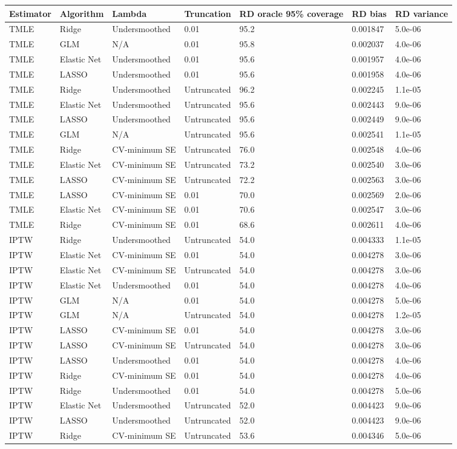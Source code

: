 
\begin{longtable}[l]{lllllll}
\toprule
Estimator & Algorithm & Lambda & Truncation & RD oracle 95\% coverage & RD bias & RD variance\\
\midrule
TMLE & Ridge & Undersmoothed & 0.01 & 95.2 & 0.001847 & 5.0e-06\\
TMLE & GLM & N/A & 0.01 & 95.8 & 0.002037 & 4.0e-06\\
TMLE & Elastic Net & Undersmoothed & 0.01 & 95.6 & 0.001957 & 4.0e-06\\
TMLE & LASSO & Undersmoothed & 0.01 & 95.6 & 0.001958 & 4.0e-06\\
TMLE & Ridge & Undersmoothed & Untruncated & 96.2 & 0.002245 & 1.1e-05\\
TMLE & Elastic Net & Undersmoothed & Untruncated & 95.6 & 0.002443 & 9.0e-06\\
TMLE & LASSO & Undersmoothed & Untruncated & 95.6 & 0.002449 & 9.0e-06\\
TMLE & GLM & N/A & Untruncated & 95.6 & 0.002541 & 1.1e-05\\
TMLE & Ridge & CV-minimum SE & Untruncated & 76.0 & 0.002548 & 4.0e-06\\
TMLE & Elastic Net & CV-minimum SE & Untruncated & 73.2 & 0.002540 & 3.0e-06\\
TMLE & LASSO & CV-minimum SE & Untruncated & 72.2 & 0.002563 & 3.0e-06\\
TMLE & LASSO & CV-minimum SE & 0.01 & 70.0 & 0.002569 & 2.0e-06\\
TMLE & Elastic Net & CV-minimum SE & 0.01 & 70.6 & 0.002547 & 3.0e-06\\
TMLE & Ridge & CV-minimum SE & 0.01 & 68.6 & 0.002611 & 4.0e-06\\
IPTW & Ridge & Undersmoothed & Untruncated & 54.0 & 0.004333 & 1.1e-05\\
IPTW & Elastic Net & CV-minimum SE & 0.01 & 54.0 & 0.004278 & 3.0e-06\\
IPTW & Elastic Net & CV-minimum SE & Untruncated & 54.0 & 0.004278 & 3.0e-06\\
IPTW & Elastic Net & Undersmoothed & 0.01 & 54.0 & 0.004278 & 4.0e-06\\
IPTW & GLM & N/A & 0.01 & 54.0 & 0.004278 & 5.0e-06\\
IPTW & GLM & N/A & Untruncated & 54.0 & 0.004278 & 1.2e-05\\
IPTW & LASSO & CV-minimum SE & 0.01 & 54.0 & 0.004278 & 3.0e-06\\
IPTW & LASSO & CV-minimum SE & Untruncated & 54.0 & 0.004278 & 3.0e-06\\
IPTW & LASSO & Undersmoothed & 0.01 & 54.0 & 0.004278 & 4.0e-06\\
IPTW & Ridge & CV-minimum SE & 0.01 & 54.0 & 0.004278 & 4.0e-06\\
IPTW & Ridge & Undersmoothed & 0.01 & 54.0 & 0.004278 & 5.0e-06\\
IPTW & Elastic Net & Undersmoothed & Untruncated & 52.0 & 0.004423 & 9.0e-06\\
IPTW & LASSO & Undersmoothed & Untruncated & 52.0 & 0.004423 & 9.0e-06\\
IPTW & Ridge & CV-minimum SE & Untruncated & 53.6 & 0.004346 & 5.0e-06\\
\bottomrule
\end{longtable}
